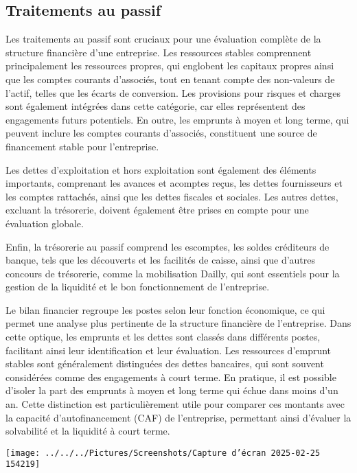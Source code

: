 \documentclass[a4paper, 12pt]{report}
\begin{document}
\subsection{Traitements au passif}

Les traitements au passif sont cruciaux pour une évaluation complète de la structure financière d'une entreprise. Les ressources stables comprennent principalement les ressources propres, qui englobent les capitaux propres ainsi que les comptes courants d'associés, tout en tenant compte des non-valeurs de l'actif, telles que les écarts de conversion. Les provisions pour risques et charges sont également intégrées dans cette catégorie, car elles représentent des engagements futurs potentiels. En outre, les emprunts à moyen et long terme, qui peuvent inclure les comptes courants d'associés, constituent une source de financement stable pour l'entreprise. 

Les dettes d'exploitation et hors exploitation sont également des éléments importants, comprenant les avances et acomptes reçus, les dettes fournisseurs et les comptes rattachés, ainsi que les dettes fiscales et sociales. Les autres dettes, excluant la trésorerie, doivent également être prises en compte pour une évaluation globale. 

Enfin, la trésorerie au passif comprend les escomptes, les soldes créditeurs de banque, tels que les découverts et les facilités de caisse, ainsi que d'autres concours de trésorerie, comme la mobilisation Dailly, qui sont essentiels pour la gestion de la liquidité et le bon fonctionnement de l'entreprise.

Le bilan financier regroupe les postes selon leur fonction économique, ce qui permet une analyse plus pertinente de la structure financière de l'entreprise. Dans cette optique, les emprunts et les dettes sont classés dans différents postes, facilitant ainsi leur identification et leur évaluation. Les ressources d'emprunt stables sont généralement distinguées des dettes bancaires, qui sont souvent considérées comme des engagements à court terme. En pratique, il est possible d'isoler la part des emprunts à moyen et long terme qui échue dans moins d'un an. Cette distinction est particulièrement utile pour comparer ces montants avec la capacité d'autofinancement (CAF) de l'entreprise, permettant ainsi d'évaluer la solvabilité et la liquidité à court terme.

\begin{center}
	\texttt{[image: ../../../Pictures/Screenshots/Capture d'écran 2025-02-25 154219]}
\end{center}
\end{document}
